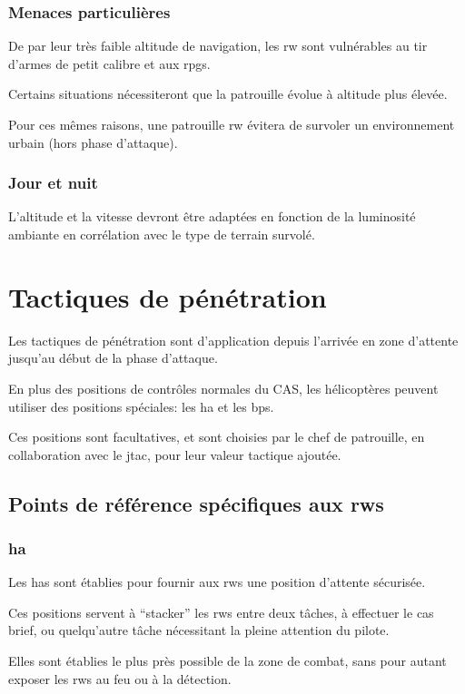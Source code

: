 \subsubsection{Menaces particulières}

\e
    \item De par leur très faible altitude de navigation, les \gls{rw} sont vulnérables au tir d’armes de petit calibre et aux \glspl{rpg}.
    \item Certains situations nécessiteront que la patrouille évolue à altitude plus élevée.
    \item Pour ces mêmes raisons, une patrouille \gls{rw} évitera de survoler un environnement urbain (hors phase d’attaque).
\ed

\subsubsection{Jour et nuit}

\e
    \item L’altitude et la vitesse devront être adaptées en fonction de la luminosité ambiante en corrélation avec le type de terrain survolé.
\ed

\section{Tactiques de pénétration}

\e
    \item Les tactiques de pénétration sont d’application depuis l’arrivée en zone d’attente jusqu’au début de la phase d’attaque.
    \item En plus des positions de contrôles normales du CAS, les hélicoptères peuvent utiliser des positions spéciales: les \gls{ha} et les \glspl{bp}.
    \item Ces positions sont facultatives, et sont choisies par le chef de patrouille, en collaboration avec le \gls{jtac}, pour leur valeur tactique ajoutée.
\ed

\subsection{Points de référence spécifiques aux \glspl{rw}}

\subsubsection{\acrfull{ha}}

\e
    \item Les \glspl{ha} sont établies pour fournir aux \glspl{rw} une position d’attente sécurisée.
    \item Ces positions servent à “stacker” les \glspl{rw} entre deux tâches, à effectuer le \gls{cas} brief, ou quelqu’autre tâche nécessitant la pleine attention du pilote.
    \item Elles sont établies le plus près possible de la zone de combat, sans pour autant exposer les \glspl{rw} au feu ou à la détection.
\ed

